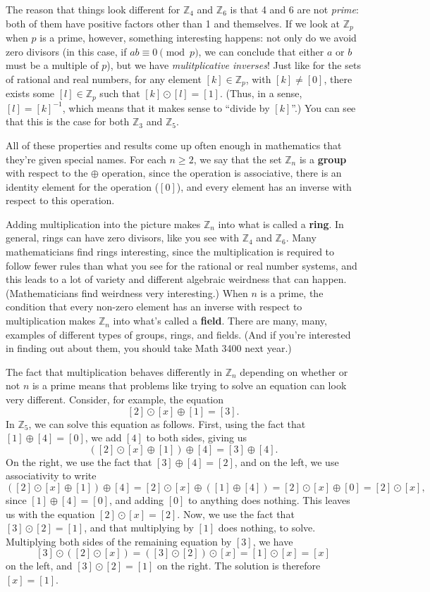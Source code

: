\documentclass[letterpaper,12pt]{article}
\newcommand{\Z}{\mathbb{Z}}
\begin{document}
The reason that things look different for $\Z_4$ and $\Z_6$ is that 4 and 6 are not {\em prime}: both of them have positive factors other than 1 and themselves. If we look at $\Z_p$ when $p$ is a prime, however, something interesting happens: not only do we avoid zero divisors (in this case, if $ab\equiv 0 \pmod{p}$, we can conclude that either $a$ or $b$ must be a multiple of $p$), but we have {\em mulitplicative inverses}! Just like for the sets of rational and real numbers, for any element $[k]\in\Z_p$, with $[k]\neq [0]$, there exists some $[l]\in \Z_p$ such that $[k]\odot [l] = [1]$. (Thus, in a sense, $[l] = [k]^{-1}$, which means that it makes sense to ``divide by $[k]$''.) You can see that this is the case for both $\Z_3$ and $\Z_5$.

All of these properties and results come up often enough in mathematics that they're given special names. For each $n\geq 2$, we say that the set $\Z_n$ is a {\bf group} with respect to the $\oplus$ operation, since the operation is associative, there is an identity element for the operation ($[0]$), and every element has an inverse with respect to this operation.

Adding multiplication into the picture makes $\Z_n$ into what is called a {\bf ring}. In general, rings can have zero divisors, like you see with $\Z_4$ and $\Z_6$. Many mathematicians find rings interesting, since the multiplication is required to follow fewer rules than what you see for the rational or real number systems, and this leads to a lot of variety and different algebraic weirdness that can happen. (Mathematicians find weirdness very interesting.) When $n$ is a prime, the condition that every non-zero element has an inverse with respect to multiplication makes $\Z_n$ into what's called a {\bf field}. There are many, many, examples of different types of groups, rings, and fields. (And if you're interested in finding out about them, you should take Math 3400 next year.)

The fact that multiplication behaves differently in $\Z_n$ depending on whether or not $n$ is a prime means that problems like trying to solve an equation can look very different. Consider, for example, the equation
\[
 [2]\odot [x] \oplus [1] = [3].
\]
In $\Z_5$, we can solve this equation as follows. First, using the fact that $[1]\oplus [4] = [0]$, we add $[4]$ to both sides, giving us
\[
 ([2]\odot [x] \oplus [1])\oplus [4] = [3]\oplus [4].
\]
On the right, we use the fact that $[3]\oplus [4] = [2]$, and on the left, we use associativity to write
\[
 ([2]\odot [x] \oplus [1]) \oplus [4] = [2]\odot[x]\oplus ([1]\oplus [4]) = [2]\odot [x] \oplus [0] = [2]\odot [x],
\]
since $[1]\oplus [4] = [0]$, and adding $[0]$ to anything does nothing. This leaves us with the equation $[2]\odot [x] = [2]$. Now, we use the fact that $[3]\odot [2] = [1]$, and that multiplying by $[1]$ does nothing, to solve. Multiplying both sides of the remaining equation by $[3]$, we have
\[
 [3]\odot([2]\odot [x]) = ([3]\odot [2])\odot [x] = [1]\odot [x] = [x]
\]
on the left, and $[3]\odot [2] = [1]$ on the right. The solution is therefore $[x]=[1]$.
\end{document}

